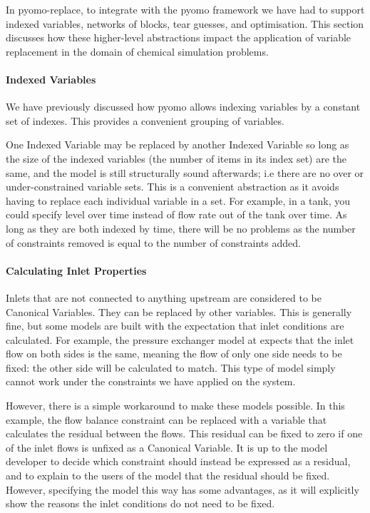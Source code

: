 In pyomo-replace, to integrate with the pyomo framework we have had to
support indexed variables, networks of blocks, tear guesses, and
optimisation. This section discusses how these higher-level abstractions
impact the application of variable replacement in the domain of chemical
simulation problems.

\hypertarget{indexed-variables}{%
\paragraph{Indexed Variables}\label{indexed-variables}}

We have previously discussed how pyomo allows indexing variables by a
constant set of indexes. This provides a convenient grouping of
variables.

One Indexed Variable may be replaced by another Indexed Variable so long
as the size of the indexed variables (the number of items in its index
set) are the same, and the model is still structurally sound afterwards;
i.e there are no over or under-constrained variable sets. This is a
convenient abstraction as it avoids having to replace each individual
variable in a set. For example, in a tank, you could specify level over
time instead of flow rate out of the tank over time. As long as they are
both indexed by time, there will be no problems as the number of
constraints removed is equal to the number of constraints added.

\hypertarget{calculating-inlet-properties}{%
\paragraph{Calculating Inlet
Properties}\label{calculating-inlet-properties}}

Inlets that are not connected to anything upstream are considered to be
Canonical Variables. They can be replaced by other variables. This is
generally fine, but some models are built with the expectation that
inlet conditions are calculated. For example, the pressure exchanger
model at \citep{watertap_pressure_exchanger} expects that the inlet flow
on both sides is the same, meaning the flow of only one side needs to be
fixed: the other side will be calculated to match. This type of model
simply cannot work under the constraints we have applied on the system.

However, there is a simple workaround to make these models possible. In
this example, the flow balance constraint can be replaced with a
variable that calculates the residual between the flows. This residual
can be fixed to zero if one of the inlet flows is unfixed as a Canonical
Variable. It is up to the model developer to decide which constraint
should instead be expressed as a residual, and to explain to the users
of the model that the residual should be fixed. However, specifying the
model this way has some advantages, as it will explicitly show the
reasons the inlet conditions do not need to be fixed.

